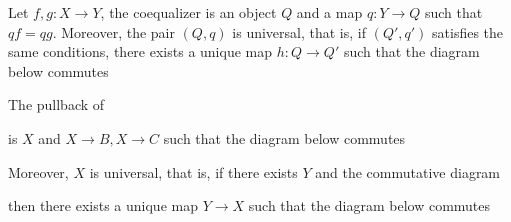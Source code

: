 \documentclass{report}
\begin{document}
\begin{definition}[coequalizer]
    Let $f, g: X \to Y$, the coequalizer is an object $Q$ and a map $q: Y \to Q$ such that $q f = q g$. Moreover, the pair $(Q, q)$ is universal, that is, if $(Q', q')$ satisfies the same conditions, there exists a unique map $h: Q \to Q'$ such that the diagram below commutes
    \begin{center}
    \end{center}
\end{definition}

\begin{definition}[pullback]
    The pullback of  is $X$ and $X \to B, X \to C$ such that the diagram below commutes
    \begin{center}
    \end{center}
    Moreover, $X$ is universal, that is, if there exists $Y$ and the commutative diagram 
    \begin{center}
    \end{center}
    then there exists a unique map $Y \to X$ such that the diagram below commutes
    \begin{center}
    \end{center}
\end{definition}
\end{document}

